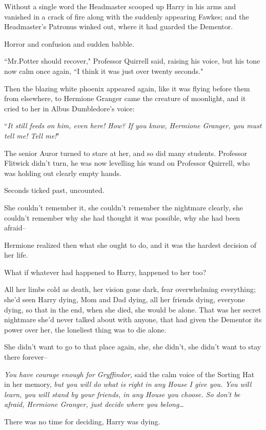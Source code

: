 Without a single word the Headmaster scooped up Harry in his arms and vanished in a crack of fire along with the suddenly appearing Fawkes; and the Headmaster's Patronus winked out, where it had guarded the Dementor.

Horror and confusion and sudden babble.

``Mr.\?Potter should recover," Professor Quirrell said, raising his voice, but his tone now calm once again, ``I think it was just over twenty seconds."

Then the blazing white phoenix appeared again, like it was flying before them from elsewhere, to Hermione Granger came the creature of moonlight, and it cried to her in Albus Dumbledore's voice:

``\emph{It still feeds on him, even here! How? If you know, Hermione Granger, you must tell me! Tell me!}"

The senior Auror turned to stare at her, and so did many students. Professor Flitwick didn't turn, he was now levelling his wand on Professor Quirrell, who was holding out clearly empty hands.

Seconds ticked past, uncounted.

She couldn't remember it, she couldn't remember the nightmare clearly, she couldn't remember why she had thought it was possible, why she had been afraid\---

Hermione realized then what she ought to do, and it was the hardest decision of her life.

What if whatever had happened to Harry, happened to her too?

All her limbs cold as death, her vision gone dark, fear overwhelming everything; she'd seen Harry dying, Mom and Dad dying, all her friends dying, everyone dying, so that in the end, when she died, she would be alone. That was her secret nightmare she'd never talked about with anyone, that had given the Dementor its power over her, the loneliest thing was to die alone.

She didn't want to go to that place again, she, she didn't, she didn't want to stay there forever\---

\emph{You have courage enough for Gryffindor,} said the calm voice of the Sorting Hat in her memory, \emph{but you will do what is right in any House I give you. You will learn, you will stand by your friends, in any House you choose. So don't be afraid, Hermione Granger, just decide where you belong{\ldots}}

There was no time for deciding, Harry was dying.

